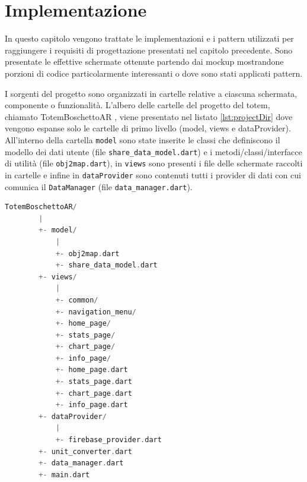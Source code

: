 \chapter{Implementazione}
In questo capitolo vengono trattate le implementazioni e i pattern utilizzati per raggiungere i requisiti di progettazione presentati nel capitolo precedente. Sono presentate le effettive schermate ottenute partendo dai mockup mostrandone porzioni di codice particolarmente interessanti o dove sono stati applicati pattern.

I sorgenti del progetto sono organizzati in cartelle relative a ciascuna schermata, componente o funzionalità. L'albero delle cartelle del progetto del totem, chiamato TotemBoschettoAR \cite{repoTotemBoschettoAR}, viene presentato nel listato \ref{lst:projectDir} dove vengono espanse solo le cartelle di primo livello (model, views e dataProvider). All'interno della cartella \texttt{model} sono state inserite le classi che definiscono il modello dei dati utente (file \texttt{share\_data\_model.dart}) e i metodi/classi/interfacce di utilità (file \texttt{obj2map.dart}), in \texttt{views} sono presenti i file delle schermate raccolti in cartelle e infine in \texttt{dataProvider} sono contenuti tutti i provider di dati con cui comunica il \texttt{DataManager} (file \texttt{data\_manager.dart}).

\begin{lstlisting}[language=C, caption={Albero della directory del progetto TotemBoschettoAR}, label={lst:projectDir}]
    TotemBoschettoAR/
        |
        +- model/
            |
            +- obj2map.dart
            +- share_data_model.dart
        +- views/
            |
            +- common/
            +- navigation_menu/
            +- home_page/
            +- stats_page/
            +- chart_page/
            +- info_page/
            +- home_page.dart
            +- stats_page.dart
            +- chart_page.dart
            +- info_page.dart
        +- dataProvider/
            |
            +- firebase_provider.dart
        +- unit_converter.dart
        +- data_manager.dart
        +- main.dart
\end{lstlisting}

